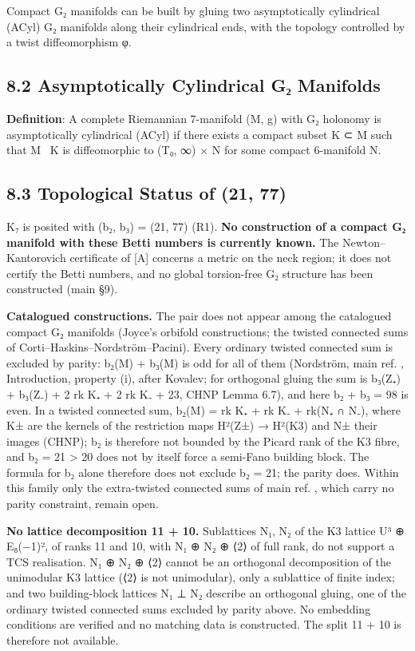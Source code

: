 \documentclass[11pt,a4paper]{article}
\begin{document}
Compact G₂ manifolds can be built by gluing two asymptotically cylindrical (ACyl) G₂ manifolds along their cylindrical ends, with the topology controlled by a twist diffeomorphism φ.

\subsection{8.2 Asymptotically Cylindrical G₂ Manifolds}\label{asymptotically-cylindrical-gux2082-manifolds}

\textbf{Definition}: A complete Riemannian 7-manifold (M, g) with G₂ holonomy is asymptotically cylindrical (ACyl) if there exists a compact subset K ⊂ M such that M ~K is diffeomorphic to (T₀, ∞) × N for some compact 6-manifold N.

\subsection{8.3 Topological Status of (21, 77)}\label{topological-status-of-21-77}

K₇ is posited with (b₂, b₃) = (21, 77) (R1). \textbf{No construction of a compact G₂ manifold with these Betti numbers is currently known.} The Newton--Kantorovich certificate of {[}A{]} concerns a metric on the neck region; it does not certify the Betti numbers, and no global torsion-free G₂ structure has been constructed (main §9).

\textbf{Catalogued constructions.} The pair does not appear among the catalogued compact G₂ manifolds (Joyce's orbifold constructions; the twisted connected sums of Corti--Haskins--Nordström--Pacini). Every ordinary twisted connected sum is excluded by parity: b₂(M) + b₃(M) is odd for all of them (Nordström, main ref. \cite{14}, Introduction, property (i), after Kovalev; for orthogonal gluing the sum is b₃(Z₊) + b₃(Z₋) + 2 rk K₊ + 2 rk K₋ + 23, CHNP Lemma 6.7), and here b₂ + b₃ = 98 is even. In a twisted connected sum, b₂(M) = rk K₊ + rk K₋ + rk(N₊ ∩ N₋), where K± are the kernels of the restriction maps H²(Z±) → H²(K3) and N± their images (CHNP); b₂ is therefore not bounded by the Picard rank of the K3 fibre, and b₂ = 21 \textgreater{} 20 does not by itself force a semi-Fano building block. The formula for b₂ alone therefore does not exclude b₂ = 21; the parity does. Within this family only the extra-twisted connected sums of main ref. \cite{14}, which carry no parity constraint, remain open.

\textbf{No lattice decomposition 11 + 10.} Sublattices N₁, N₂ of the K3 lattice U³ ⊕ E₈(−1)², of ranks 11 and 10, with N₁ ⊕ N₂ ⊕ ⟨2⟩ of full rank, do not support a TCS realisation. N₁ ⊕ N₂ ⊕ ⟨2⟩ cannot be an orthogonal decomposition of the unimodular K3 lattice (⟨2⟩ is not unimodular), only a sublattice of finite index; and two building-block lattices N₁ ⊥ N₂ describe an orthogonal gluing, one of the ordinary twisted connected sums excluded by parity above. No embedding conditions are verified and no matching data is constructed. The split 11 + 10 is therefore not available.
\end{document}
